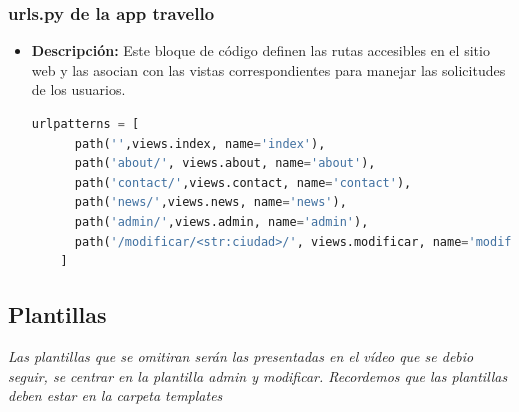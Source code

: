 \documentclass{article}
\begin{document}

  \subsubsection{urls.py de la app travello}
  \begin{itemize}
    \item \textbf{Descripción: }Este bloque de código definen las rutas accesibles en el sitio web y las asocian con las vistas 
    correspondientes para manejar las solicitudes de los usuarios.
    \begin{lstlisting}[language=Python, caption={urls Travello}]
    urlpatterns = [
      path('',views.index, name='index'),
      path('about/', views.about, name='about'),
      path('contact/',views.contact, name='contact'),
      path('news/',views.news, name='news'),
      path('admin/',views.admin, name='admin'),
      path('/modificar/<str:ciudad>/', views.modificar, name='modificar'),
    ]
    \end{lstlisting}
  \end{itemize}
  

  \subsection{Plantillas}
  \textit{Las plantillas que se omitiran serán las presentadas en el vídeo que se debio seguir, se centrar en la plantilla admin y modificar. 
  Recordemos que las plantillas deben estar en la carpeta templates}
  
\end{document}
